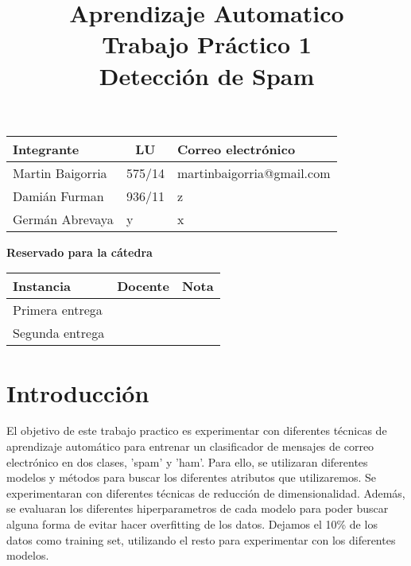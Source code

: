 \documentclass[10pt,a4paper]{article}
\title{Aprendizaje Automatico \\ Trabajo Práctico 1 \\ Detección de Spam }
\begin{document}

\maketitle

\bigskip

\begin{table}[h]
\centering
\begin{tabular}{|l l l|}
\hline
Integrante       & \multicolumn{1}{c}{LU}     & Correo electrónico        \\ \hline
Martin Baigorria & \multicolumn{1}{c}{575/14} & martinbaigorria@gmail.com \\ 
Damián Furman & 	936/11                      & z \\
Germán Abrevaya & y                      & x \\ \hline
\end{tabular}
\end{table}

\vfill

\begin{center}
\textbf{Reservado para la cátedra}
\end{center}
\begin{table}[h]
\centering
\begin{tabular}{|l|l|l|}
\hline
Instancia       & Docente & Nota \\ \hline
Primera entrega &         &      \\ \hline
Segunda entrega &         &      \\ \hline
\end{tabular}
\end{table}

\newpage
\tableofcontents
\newpage


\section{Introducción}

El objetivo de este trabajo practico es experimentar con diferentes técnicas de aprendizaje automático para entrenar un clasificador de mensajes de correo electrónico en dos clases, 'spam' y 'ham'. Para ello, se utilizaran diferentes modelos y métodos para buscar los diferentes atributos que utilizaremos. Se experimentaran con diferentes técnicas de reducción de dimensionalidad. Además, se evaluaran los diferentes hiperparametros de cada modelo para poder buscar alguna forma de evitar hacer overfitting de los datos. Dejamos el 10\% de los datos como training set, utilizando el resto para experimentar con los diferentes modelos.
\end{document}
